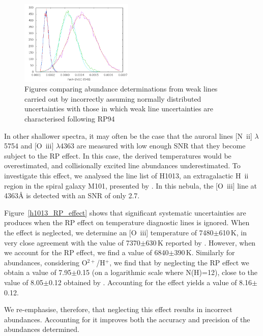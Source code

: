 \documentclass[useAMS,usenatbib]{mn2e}
\begin{document}
\begin{figure}
\includegraphics[width=0.48\textwidth]{figures/ngc6543_ne_rpeffect.png}
\caption{Figures comparing abundance determinations from weak lines carried out by incorrectly assuming normally distributed uncertainties with those in which weak line uncertainties are characterised following RP94}
\label{RP_figures}
\end{figure}

In other shallower spectra, it may often be the case that the auroral lines [N~{\sc ii}] $\lambda$5754 and [O~{\sc iii}] $\lambda$4363 are measured with low enough SNR that they become subject to the RP effect.  In this case, the derived temperatures would be overestimated, and collisionally excited line abundances underestimated.  To investigate this effect, we analysed the line list of H1013, an extragalactic H~{\sc ii} region in the spiral galaxy M101, presented by \citet{2009ApJ...700..654E}.  In this nebula, the [O~{\sc iii}] line at 4363{\AA} is detected with an SNR of only 2.7.

Figure~\ref{h1013_RP_effect} shows that significant systematic uncertainties are produces when the RP effect on temperature diagnostic lines is ignored.  When the effect is neglected, we determine an [O~{\sc iii}] temperature of 7480$\pm$610\,K, in very close agreement with the value of 7370$\pm$630\,K reported by \citet{2009ApJ...700..654E}.  However, when we account for the RP effect, we find a value of 6840$\pm$390\,K.  Similarly for abundances, considering O$^{2+}$/H$^+$, we find that by neglecting the RP effect we obtain a value of 7.95$\pm$0.15 (on a logarithmic scale where N(H)=12), close to the value of 8.05$\pm$0.12 obtained by \citet{2009ApJ...700..654E}.  Accounting for the effect yields a value of 8.16$\pm$0.12.

We re-emphasise, therefore, that neglecting this effect results in incorrect abundances.  Accounting for it improves both the accuracy and precision of the abundances determined.
\end{document}
